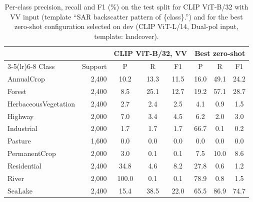 \begin{table}[t]
\centering
\scriptsize
\caption{Per-class precision, recall and F1 (\%) on the test split for CLIP ViT-B/32 with VV input (template ``SAR backscatter pattern of \{class\}.'') and for the best zero-shot configuration selected on dev (CLIP ViT-L/14, Dual-pol input, template: landcover).}
\label{tab:perclass}
\begin{tabular*}{\hsize}{@{\extracolsep{\fill}}lrcccccc@{}}
\toprule
& & \multicolumn{3}{c}{CLIP ViT-B/32, VV} & \multicolumn{3}{c}{Best zero-shot} \\
\cmidrule(lr){3-5}\cmidrule(lr){6-8}
Class & Support & P & R & F1 & P & R & F1 \\
\midrule
AnnualCrop & 2,400 & 10.2 & 13.3 & 11.5 & 16.0 & 49.1 & 24.2 \\
Forest & 2,400 & 8.5 & 25.1 & 12.7 & 19.2 & 57.1 & 28.7 \\
HerbaceousVegetation & 2,400 & 2.7 & 2.4 & 2.5 & 4.1 & 0.9 & 1.5 \\
Highway & 2,000 & 7.0 & 3.4 & 4.5 & 6.2 & 2.0 & 3.0 \\
Industrial & 2,000 & 1.7 & 1.7 & 1.7 & 66.7 & 0.1 & 0.2 \\
Pasture & 1,600 & 0.0 & 0.0 & 0.0 & 0.0 & 0.0 & 0.0 \\
PermanentCrop & 2,000 & 3.0 & 0.1 & 0.1 & 7.5 & 10.0 & 8.6 \\
Residential & 2,400 & 34.8 & 4.6 & 8.2 & 27.8 & 0.6 & 1.2 \\
River & 2,000 & 100.0 & 0.1 & 0.1 & 78.9 & 0.8 & 1.5 \\
SeaLake & 2,400 & 15.4 & 38.5 & 22.0 & 65.5 & 86.9 & 74.7 \\
\bottomrule
\end{tabular*}
\end{table}
